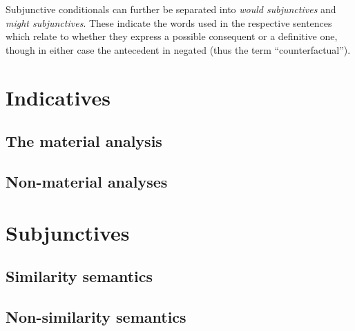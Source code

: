 \documentclass[12pt]{report}
\begin{document}
Subjunctive conditionals can further be separated into \emph{would subjunctives}
and \emph{might subjunctives}. These indicate the words used in the respective
sentences which relate to whether they express a possible consequent or a
definitive one, though in either case the antecedent in negated (thus the term
``counterfactual'').

\part{Indicatives}
\chapter{The material analysis}

\chapter{Non-material analyses}

\part{Subjunctives}
\chapter{Similarity semantics}

\chapter{Non-similarity semantics}
\end{document}
